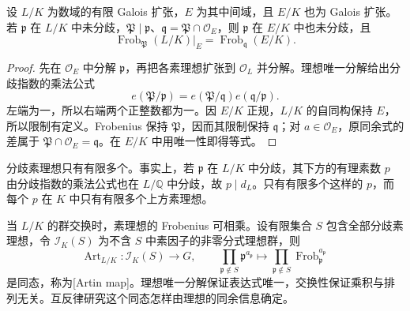 \begin{corollary}\label{b3:cor:frobenius-restriction}
	设 \(L/K\) 为数域的有限 Galois 扩张，\(E\) 为其中间域，且 \(E/K\) 也为 Galois 扩张。若 \(\mathfrak p\) 在 \(L/K\) 中未分歧，\(\mathfrak P\mid\mathfrak p\)、\(\mathfrak q=\mathfrak P\cap\mathcal O_E\)，则 \(\mathfrak p\) 在 \(E/K\) 中也未分歧，且
	\[
		\operatorname{Frob}_{\mathfrak P}(L/K)|_E
		=\operatorname{Frob}_{\mathfrak q}(E/K).
	\]
\end{corollary}
\begin{proof}
	先在 \(\mathcal O_E\) 中分解 \(\mathfrak p\)，再把各素理想扩张到 \(\mathcal O_L\) 并分解。理想唯一分解给出分歧指数的乘法公式
	\[
		e(\mathfrak P/\mathfrak p)=e(\mathfrak P/\mathfrak q)e(\mathfrak q/\mathfrak p).
	\]
	左端为一，所以右端两个正整数都为一。因 \(E/K\) 正规，\(L/K\) 的自同构保持 \(E\)，所以限制有定义。Frobenius 保持 \(\mathfrak P\)，因而其限制保持 \(\mathfrak q\)；对 \(a\in\mathcal O_E\)，原同余式的差属于 \(\mathfrak P\cap\mathcal O_E=\mathfrak q\)。在 \(E/K\) 中用唯一性即得等式。
\end{proof}

分歧素理想只有有限多个。事实上，若 \(\mathfrak p\) 在 \(L/K\) 中分歧，其下方的有理素数 \(p\) 由分歧指数的乘法公式也在 \(L/\mathbb Q\) 中分歧，故 \(p\mid d_L\)。只有有限多个这样的 \(p\)，而每个 \(p\) 在 \(K\) 中只有有限多个上方素理想。

\ProseParagraphBreak
当 \(L/K\) 的群交换时，素理想的 Frobenius 可相乘。设有限集合 \(S\) 包含全部分歧素理想，令 \(\mathcal I_K(S)\) 为不含 \(S\) 中素因子的非零分式理想群，则
\[
	\operatorname{Art}_{L/K}:\mathcal I_K(S)\longrightarrow G,\qquad
	\prod_{\mathfrak p\notin S}\mathfrak p^{a_{\mathfrak p}}
	\longmapsto\prod_{\mathfrak p\notin S}\operatorname{Frob}_{\mathfrak p}^{a_{\mathfrak p}}
\]
是同态，称为[Artin map]。理想唯一分解保证表达式唯一，交换性保证乘积与排列无关。互反律研究这个同态怎样由理想的同余信息确定。

